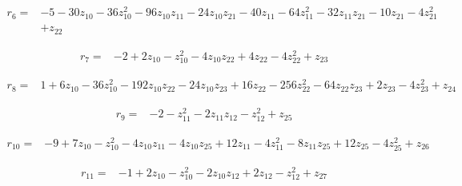 \par\noindent\begin{minipage}{\linewidth}
\begin{align*}
r_{6}={}&-5-30z_{10}-36z_{10}^{2}-96z_{10}z_{11}-24z_{10}z_{21}-40z_{11}-64z_{11}^{2}-32z_{11}z_{21}-10z_{21}-4z_{21}^{2}\\[-2pt]
&+z_{22}
\end{align*}
\end{minipage}\par
\par\noindent\begin{minipage}{\linewidth}
\begin{align*}
r_{7}={}&-2+2z_{10}-z_{10}^{2}-4z_{10}z_{22}+4z_{22}-4z_{22}^{2}+z_{23}
\end{align*}
\end{minipage}\par
\par\noindent\begin{minipage}{\linewidth}
\begin{align*}
r_{8}={}&1+6z_{10}-36z_{10}^{2}-192z_{10}z_{22}-24z_{10}z_{23}+16z_{22}-256z_{22}^{2}-64z_{22}z_{23}+2z_{23}-4z_{23}^{2}+z_{24}
\end{align*}
\end{minipage}\par
\par\noindent\begin{minipage}{\linewidth}
\begin{align*}
r_{9}={}&-2-z_{11}^{2}-2z_{11}z_{12}-z_{12}^{2}+z_{25}
\end{align*}
\end{minipage}\par
\par\noindent\begin{minipage}{\linewidth}
\begin{align*}
r_{10}={}&-9+7z_{10}-z_{10}^{2}-4z_{10}z_{11}-4z_{10}z_{25}+12z_{11}-4z_{11}^{2}-8z_{11}z_{25}+12z_{25}-4z_{25}^{2}+z_{26}
\end{align*}
\end{minipage}\par
\par\noindent\begin{minipage}{\linewidth}
\begin{align*}
r_{11}={}&-1+2z_{10}-z_{10}^{2}-2z_{10}z_{12}+2z_{12}-z_{12}^{2}+z_{27}
\end{align*}
\end{minipage}\par
